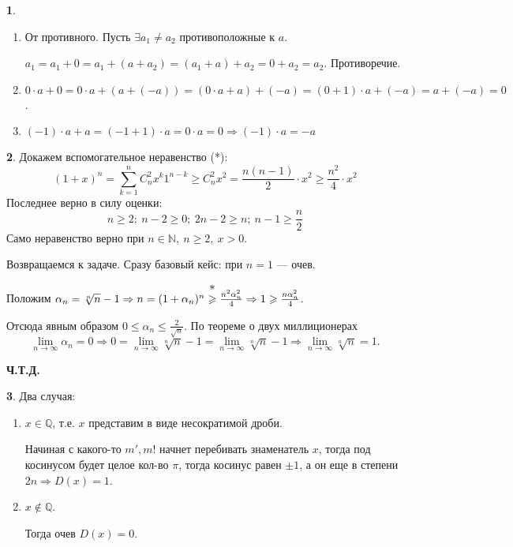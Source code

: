 \documentclass[14pt, a4paper]{extarticle}
\theoremstyle{definition}
\newtheorem{problem}{}
\theoremstyle{definition}
\theoremstyle{remark}
\numberwithin{equation}{section}
\newcommand{\N}{\ensuremath{\mathbb{N}}}
\newcommand{\Q}{\ensuremath{\mathbb{Q}}}
\begin{document}
\begin{problem}
    \renewcommand{\labelenumi}{\alph{enumi})}
    \begin{enumerate}
        \item От противного. Пусть $\exists a_1 \neq a_2$ противоположные к $a$.
        
        $a_1 = a_1 + 0 = a_1 + (a + a_2) = (a_1 + a) + a_2 = 0 + a_2 = a_2$.
        Противоречие.
        
        \item $0 \cdot a + 0 = 0 \cdot a + (a + (-a)) = (0 \cdot a + a) + (-a) = 
        (0 + 1) \cdot a + (-a) = a + (-a) = 0$.
        
        \item $(-1) \cdot a + a = (-1 + 1) \cdot a = 0 \cdot a = 0 \Rightarrow (-1) \cdot a = -a$
    \end{enumerate}
\end{problem}

\begin{problem}
    Докажем вспомогательное неравенство (*):
    \[(1 + x)^n = \sum_{k = 1}^{n} C_n^2 x^k 1^{n-k} \geqslant 
    C_n^2 x^2 = \frac{n(n - 1)}{2} \cdot x^2 \geqslant 
    \frac{n^2}{4} \cdot x^2\]
    Последнее верно в силу оценки:
    \[n \geqslant 2;\ n - 2 \geqslant 0;\ 2n - 2 \geqslant n;\ 
    n - 1 \geqslant \frac{n}{2}\]
    Само неравенство верно при $ n \in \N,\ n \geqslant 2,\ x > 0$.

    Возвращаемся к задаче. Сразу базовый кейс: при $n = 1$ --- очев.

    {
        \newcommand\myeq{\stackrel{\mathclap{\normalfont\mbox{*}}}{\geqslant}}
        Положим $\alpha_n = \sqrt[n]{n} - 1 \Rightarrow n = (1 + 
        \alpha_n)^n \myeq \frac{n^2 \alpha_n^2}{4} \Rightarrow 1 \geqslant \frac{n \alpha_n^2}{4}$.
    }

    Отсюда явным образом  $0 \leqslant \alpha_n \leqslant \frac{2}{\sqrt{n}}$. 
    По теореме о двух миллиционерах 
    \[
    \lim_{n\to\infty}{\alpha_n} = 0 \Rightarrow 0 =
    \lim_{n\to\infty}{\sqrt[n]{n} - 1} = \lim_{n\to\infty}
    {\sqrt[n]{n}} - 1 \Rightarrow \lim_{n\to\infty}
    {\sqrt[n]{n}} = 1.\]

    \textbf{Ч.Т.Д.}
\end{problem}

\begin{problem}
    Два случая:
    \renewcommand{\labelenumi}{\alph{enumi})}
    \begin{enumerate}
        \item $x \in \Q$, т.е. $x$ представим в виде несократимой дроби. 
        
        Начиная с какого-то $m', m!$ начнет перебивать знаменатель $x$, 
        тогда под косинусом будет целое кол-во $\pi$, тогда косинус равен
        $\pm 1$, а он еще в степени $2n \Rightarrow D(x) = 1$.

        \item $x \not\in \Q$.
        
        Тогда очев $D(x) = 0$.
    \end{enumerate}
\end{problem}
\end{document}
